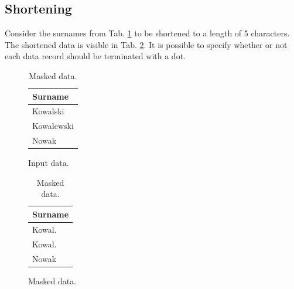 \documentclass[a4paper,twoside,12pt]{book}
\begin{document}
\subsection{Shortening}
Consider the surnames from Tab. \ref{id:tab:shortening_raw} to be shortened to a length of 5 characters.
%
%
The shortened data is visible in Tab. \ref{id:tab:shortening_masked}.
%
%
It is possible to specify whether or not each data record should be terminated with a dot.
%
%
\begin{table}
\centering
\caption{Shortening.}
\begin{subfigure}{.4\textwidth}
\centering
\caption{Input data.}
\label{id:tab:shortening_raw}
\begin{tabular}{l}
\toprule
Surname    \\ \midrule
Kowalski   \\
Kowalewski \\
Nowak      \\ \bottomrule
\end{tabular}
\end{subfigure}
\begin{subfigure}{.4\textwidth}
\centering
\caption{Masked data.}
\label{id:tab:shortening_masked}
\begin{tabular}{l}
\toprule
Surname    \\ \midrule
Kowal.     \\
Kowal.     \\
Nowak      \\ \bottomrule
\end{tabular}
\end{subfigure}
\end{table}
\end{document}
